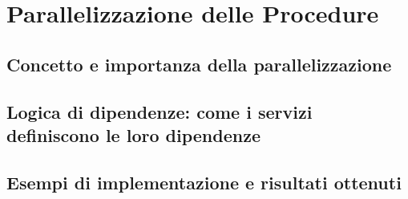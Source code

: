 \chapter{Parallelizzazione delle Procedure}
\label{cha:parallelizzazione}

\section{Concetto e importanza della parallelizzazione}
\label{sec:introduzione_parallelizzazione}

\lipsum[1]

\section{Logica di dipendenze: come i servizi definiscono le loro dipendenze}
\label{sec:dipendenze}

\lipsum[1]

\section{Esempi di implementazione e risultati ottenuti}
\label{sec:esempi_risultati}

\lipsum[1]